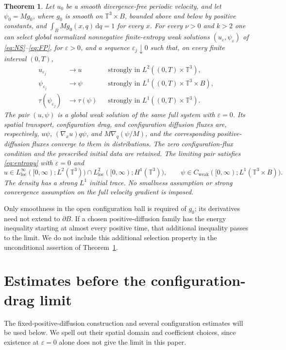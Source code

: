 \documentclass[11pt]{article}
\numberwithin{equation}{section}
\newtheorem{theorem}{Theorem}[section]
\newcommand{\T}{\mathbb T^3}
\newcommand{\dd}{\,\mathrm d}
\newcommand{\grad}{\nabla}
\begin{document}
\begin{theorem}\label{thm:main}
Let $u_0$ be a smooth divergence-free periodic velocity, and let
$\psi_0=Mg_0$, where $g_0$ is smooth on $\T\times B$, bounded above and below
by positive constants, and $\int_BMg_0(x,q)\dd q=1$ for every $x$.
For every $\nu>0$ and $k>2$ one can select global normalized nonnegative
finite-entropy weak solutions $(u_\varepsilon,\psi_\varepsilon)$ of
\eqref{eq:NS}--\eqref{eq:FP}, for $\varepsilon>0$, and a sequence
$\varepsilon_j\downarrow0$ such that, on every finite interval $(0,T)$,
\begin{align}
 u_{\varepsilon_j}&\longrightarrow u
       &&\text{strongly in }L^2((0,T)\times\T),\label{eq:uconv}\\
 \psi_{\varepsilon_j}&\longrightarrow\psi
       &&\text{strongly in }L^1((0,T)\times\T\times B),\label{eq:psiconv}\\
 \tau(\psi_{\varepsilon_j})&\longrightarrow\tau(\psi)
       &&\text{strongly in }L^1((0,T)\times\T).\label{eq:tauconv}
\end{align}
The pair $(u,\psi)$ is a global weak solution of the same full system with
$\varepsilon=0$. Its spatial transport, configuration drag, and configuration
diffusion fluxes are, respectively, $u\psi$, $(\grad_xu)q\psi$, and
$M\grad_q(\psi/M)$, and the corresponding positive-diffusion fluxes converge
to them in distributions. The zero configuration-flux condition and the
prescribed initial data are retained. The limiting pair satisfies
\eqref{eq:entropy} with $\varepsilon=0$ and
\[
 u\in L^\infty_{\mathrm{loc}}([0,\infty);L^2(\T))
       \cap L^2_{\mathrm{loc}}([0,\infty);H^1(\T)),\qquad
 \psi\in C_{\mathrm{weak}}([0,\infty);L^1(\T\times B)).
\]
The density has a strong $L^1$ initial trace. No smallness assumption or strong
convergence assumption on the full velocity gradient is imposed.
\end{theorem}

Only smoothness in the open configuration ball is required of $g_0$; its
derivatives need not extend to $\partial B$. If a chosen positive-diffusion
family has the energy inequality starting at almost every positive time, that
additional inequality passes to the limit. We do not include this additional
selection property in the unconditional assertion of Theorem~\ref{thm:main}.

\section{Estimates before the configuration-drag limit}\label{sec:prelim}
The fixed-positive-diffusion construction and several configuration estimates
will be used below. We spell out their spatial domain and coefficient choices,
since existence at $\varepsilon=0$ alone does not give the limit in this paper.
\end{document}

